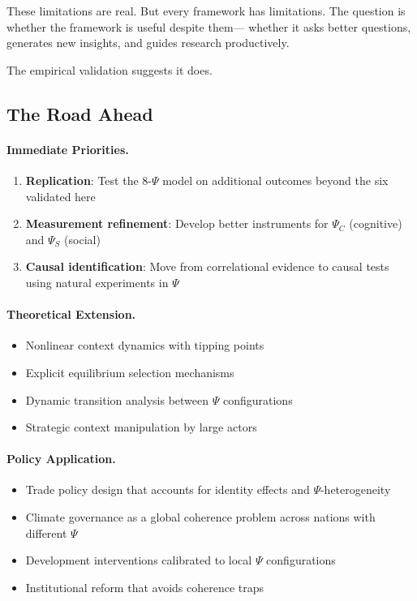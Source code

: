 \documentclass[12pt,a4paper]{article}
\begin{document}
These limitations are real. But every framework has limitations.
The question is whether the framework is useful despite them---
whether it asks better questions, generates new insights, and guides research productively.

The empirical validation suggests it does.

\subsection{The Road Ahead}

\paragraph{Immediate Priorities.}
\begin{enumerate}
    \item \textbf{Replication}: Test the 8-$\Psi$ model on additional outcomes beyond the six validated here
    \item \textbf{Measurement refinement}: Develop better instruments for $\Psi_C$ (cognitive) and $\Psi_S$ (social)
    \item \textbf{Causal identification}: Move from correlational evidence to causal tests using natural experiments in $\Psi$
\end{enumerate}

\paragraph{Theoretical Extension.}
\begin{itemize}
  \item Nonlinear context dynamics with tipping points
  \item Explicit equilibrium selection mechanisms
  \item Dynamic transition analysis between $\Psi$ configurations
  \item Strategic context manipulation by large actors
\end{itemize}

\paragraph{Policy Application.}
\begin{itemize}
  \item Trade policy design that accounts for identity effects and $\Psi$-heterogeneity
  \item Climate governance as a global coherence problem across nations with different $\Psi$
  \item Development interventions calibrated to local $\Psi$ configurations
  \item Institutional reform that avoids coherence traps
\end{itemize}
\end{document}
